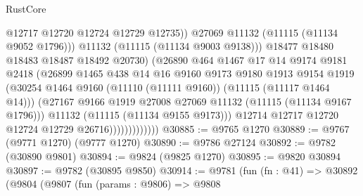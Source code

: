 \begin{lexlean}{RustCore}
\begin{coremodule}
                                      @12717
                                      @12720
                                      @12724
                                      @12729
                                      @12735))
                                  @27069
                                  @11132
                                  (@11115 (@11134 @9052 @1796)))
                                @11132
                                (@11115 (@11134 @9003 @9138)))
                              @18477
                              @18480
                              @18483
                              @18487
                              @18492
                              @20730)
                            (@26890
                              @464
                              @1467
                              @17
                              @14
                              @9174
                              @9181
                              @2418
                              (@26899
                                @1465
                                @438
                                @14
                                @16
                                @9160
                                @9173
                                @9180
                                @1913
                                @9154
                                @1919
                                (@30254
                                  @1464
                                  @9160
                                  (@11110 (@11111 @9160))
                                  (@11115 (@11117 @1464 @14)))
                                (@27167
                                  @9166
                                  @1919
                                  @27008
                                  @27069
                                  @11132
                                  (@11115 (@11134 @9167 @1796)))
                                @11132
                                (@11115 (@11134 @9155 @9173)))
                              @12714
                              @12717
                              @12720
                              @12724
                              @12729
                              @26716)))))))))))))
@30885 := @9765 @1270
@30889 := @9767 (@9771 @1270) (@9777 @1270)
@30890 := @9786 @27124
@30892 := @9782 (@30890 @9801)
@30894 := @9824 (@9825 @1270)
@30895 := @9820 @30894
@30897 := @9782 (@30895 @9850)
@30914 := @9781
    (fun (fn : @41) =>
    @30892
      (@9804
        (@9807
          (fun (params : @9806) =>
          @9808

\end{coremodule}
\end{lexlean}
